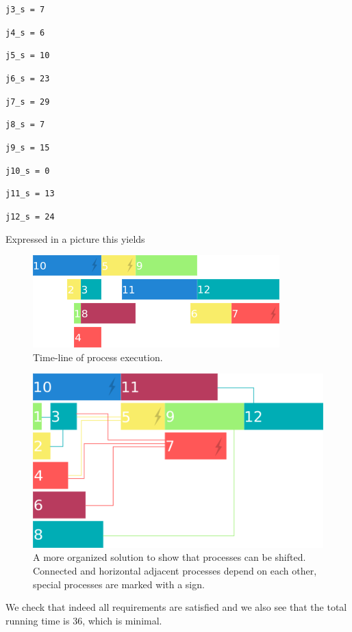 \documentclass[a4paper]{article}
\begin{document}
{\tt j3\_s = 7 }

{\tt j4\_s = 6 }

{\tt j5\_s = 10 }

{\tt j6\_s = 23 }

{\tt j7\_s = 29 }

{\tt j8\_s = 7 }

{\tt j9\_s = 15 }

{\tt j10\_s = 0 }

{\tt j11\_s = 13 }

{\tt j12\_s = 24 }

Expressed in a picture this yields

\begin{figure}[H]
	\centering
	\includegraphics[scale=1]{timeline-2.png}
	\caption{Time-line of process execution.}
\end{figure}

\begin{figure}[H]
		\centering
			\includegraphics[scale=0.7]{timeline.png}
		\caption{A more organized solution to show that processes can be shifted. Connected and horizontal adjacent processes depend on each other, special processes are marked with a sign.}
\end{figure}

We check that indeed all requirements are satisfied and we also see that the total running time is 36, which is minimal.\\
\end{document}
